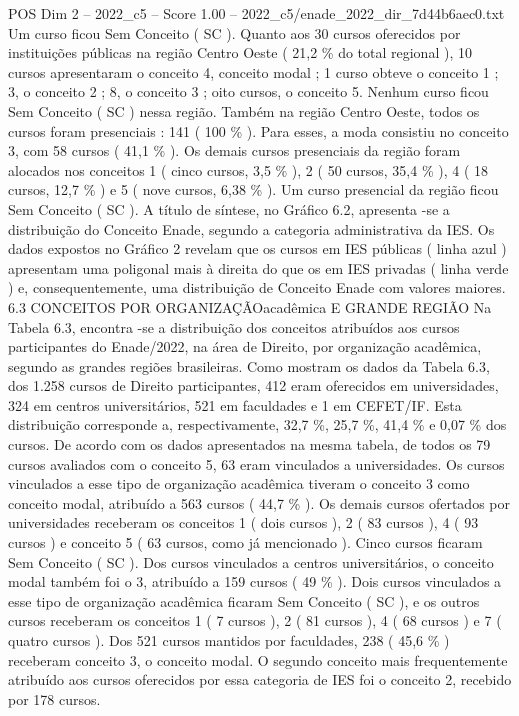 \begin{textsample}{POS Dim 2 – 2022\_c5 – Score 1.00 – 2022\_c5/enade\_2022\_dir\_7d44b6aec0.txt}
Um curso ficou Sem Conceito ( SC ).
Quanto aos 30 cursos oferecidos por instituições públicas na região Centro Oeste ( 21,2 \% do total regional ), 10 cursos apresentaram o conceito 4, conceito modal ; 1 curso obteve o conceito 1 ; 3, o conceito 2 ; 8, o conceito 3 ; oito cursos, o conceito 5.
Nenhum curso ficou Sem Conceito ( SC ) nessa região.
Também na região Centro Oeste, todos os cursos foram presenciais : 141 ( 100 \% ).
Para esses, a moda consistiu no conceito 3, com 58 cursos ( 41,1 \% ).
Os demais cursos presenciais da região foram alocados nos conceitos 1 ( cinco cursos, 3,5 \% ), 2 ( 50 cursos, 35,4 \% ), 4 ( 18 cursos, 12,7 \% ) e 5 ( nove cursos, 6,38 \% ).
Um curso presencial da região ficou Sem Conceito ( SC ).
A título de síntese, no Gráfico 6.2, apresenta -se a distribuição do Conceito Enade, segundo a categoria administrativa da IES.
Os dados expostos no Gráfico 2 revelam que os cursos em IES públicas ( linha azul ) apresentam uma poligonal mais à direita do que os em IES privadas ( linha verde ) e, consequentemente, uma distribuição de Conceito Enade com valores maiores. 6.3 CONCEITOS POR ORGANIZAÇÃOacadêmica E GRANDE REGIÃO Na Tabela 6.3, encontra -se a distribuição dos conceitos atribuídos aos cursos participantes do Enade/2022, na área de Direito, por organização acadêmica, segundo as grandes regiões brasileiras.
Como mostram os dados da Tabela 6.3, dos 1.258 cursos de Direito participantes, 412 eram oferecidos em universidades, 324 em centros universitários, 521 em faculdades e 1 em CEFET/IF.
Esta distribuição corresponde a, respectivamente, 32,7 \%, 25,7 \%, 41,4 \% e 0,07 \% dos cursos.
De acordo com os dados apresentados na mesma tabela, de todos os 79 cursos avaliados com o conceito 5, 63 eram vinculados a universidades.
Os cursos vinculados a esse tipo de organização acadêmica tiveram o conceito 3 como conceito modal, atribuído a 563 cursos ( 44,7 \% ).
Os demais cursos ofertados por universidades receberam os conceitos 1 ( dois cursos ), 2 ( 83 cursos ), 4 ( 93 cursos ) e conceito 5 ( 63 cursos, como já mencionado ).
Cinco cursos ficaram Sem Conceito ( SC ).
Dos cursos vinculados a centros universitários, o conceito modal também foi o 3, atribuído a 159 cursos ( 49 \% ).
Dois cursos vinculados a esse tipo de organização acadêmica ficaram Sem Conceito ( SC ), e os outros cursos receberam os conceitos 1 ( 7 cursos ), 2 ( 81 cursos ), 4 ( 68 cursos ) e 7 ( quatro cursos ).
Dos 521 cursos mantidos por faculdades, 238 ( 45,6 \% ) receberam conceito 3, o conceito modal.
O segundo conceito mais frequentemente atribuído aos cursos oferecidos por essa categoria de IES foi o conceito 2, recebido por 178 cursos.

\end{textsample}
